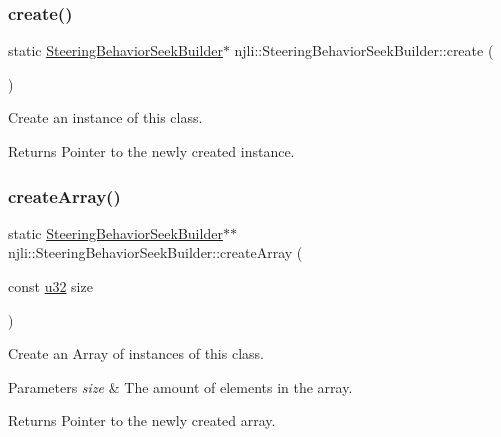 \subsubsection{\texorpdfstring{create()}{create()}}
{\footnotesize\ttfamily static \mbox{\hyperlink{classnjli_1_1_steering_behavior_seek_builder}{Steering\+Behavior\+Seek\+Builder}}$\ast$ njli\+::\+Steering\+Behavior\+Seek\+Builder\+::create (\begin{DoxyParamCaption}{ }\end{DoxyParamCaption})\hspace{0.3cm}{\ttfamily [static]}}

Create an instance of this class.

\begin{DoxyReturn}{Returns}
Pointer to the newly created instance. 
\end{DoxyReturn}
\mbox{\label{classnjli_1_1_steering_behavior_seek_builder_aeaf14539fae2b3b3a15d65a89f1397aa}} 
\subsubsection{\texorpdfstring{create\+Array()}{createArray()}}
{\footnotesize\ttfamily static \mbox{\hyperlink{classnjli_1_1_steering_behavior_seek_builder}{Steering\+Behavior\+Seek\+Builder}}$\ast$$\ast$ njli\+::\+Steering\+Behavior\+Seek\+Builder\+::create\+Array (\begin{DoxyParamCaption}\item[{const \mbox{\hyperlink{_util_8h_a10e94b422ef0c20dcdec20d31a1f5049}{u32}}}]{size }\end{DoxyParamCaption})\hspace{0.3cm}{\ttfamily [static]}}

Create an Array of instances of this class.


\begin{DoxyParams}{Parameters}
{\em size} & The amount of elements in the array.\\
\hline
\end{DoxyParams}
\begin{DoxyReturn}{Returns}
Pointer to the newly created array. 
\end{DoxyReturn}
\mbox{\label{classnjli_1_1_steering_behavior_seek_builder_abf073de73ba17537c5d3c6b7e6a0a125}} 

